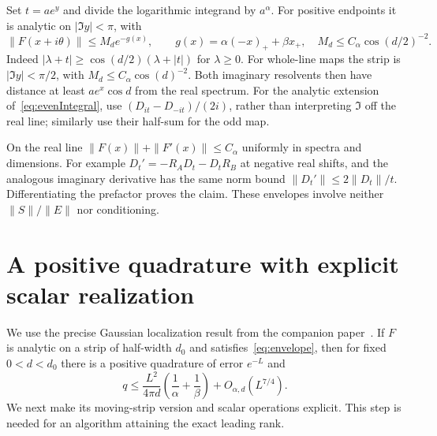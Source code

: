 \documentclass[11pt]{article}
\numberwithin{equation}{section}
\begin{document}
Set $t=a e^y$ and divide the logarithmic integrand by $a^\alpha$.
For positive endpoints it is analytic on $|\Im y|<\pi$, with
\begin{equation}\label{eq:envelope}
 \|F(x+i\theta)\|\le M_d e^{-g(x)},\qquad
 g(x)=\alpha(-x)_++\beta x_+,
 \quad M_d\le C_\alpha\cos(d/2)^{-2}.
\end{equation}
Indeed $|\lambda+t|\ge\cos(d/2)(\lambda+|t|)$ for $\lambda\ge0$.
For whole-line maps the strip is $|\Im y|<\pi/2$, with
$M_d\le C_\alpha\cos(d)^{-2}$. Both imaginary resolvents then have
distance at least $a e^x\cos d$ from the real spectrum. For the analytic
extension of~\eqref{eq:evenIntegral}, use
$(D_{it}-D_{-it})/(2i)$, rather than interpreting $\Im$ off the real
line; similarly use their half-sum for the odd map.

On the real line $\|F(x)\|+\|F'(x)\|\le C_\alpha$ uniformly in
spectra and dimensions. For example
$D_t'=-R_AD_t-D_tR_B$ at negative real shifts, and the analogous
imaginary derivative has the same norm bound
$\|D_t'\|\le2\|D_t\|/t$. Differentiating the prefactor proves the
claim. These envelopes involve neither $\|S\|/\|E\|$ nor conditioning.

\section{A positive quadrature with explicit scalar realization}

We use the precise Gaussian localization result from the companion
paper~\cite[Lemma 3.1]{Sharp}. If $F$ is analytic on a strip of
half-width $d_0$ and satisfies~\eqref{eq:envelope}, then for fixed
$0<d<d_0$ there is a positive quadrature of error $e^{-L}$ and
\begin{equation}\label{eq:fixedGaussian}
 q\le\frac{L^2}{4\pi d}\left(\frac1\alpha+\frac1\beta\right)
                   +O_{\alpha,d}(L^{7/4}).
\end{equation}
We next make its moving-strip version and scalar operations explicit.
This step is needed for an algorithm attaining the exact leading rank.
\end{document}
